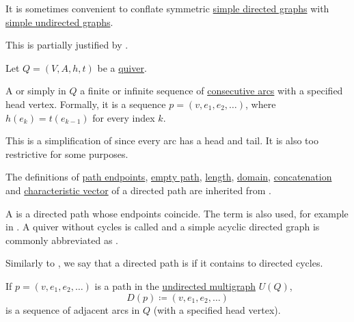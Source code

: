 \begin{remark}\label{rem:symmetric_directed_graphs}
  It is sometimes convenient to conflate symmetric \hyperref[def:quiver/simple]{simple directed graphs} with \hyperref[def:undirected_multigraph]{simple undirected graphs}.

  This is partially justified by .
\end{remark}

\begin{definition}\label{def:quiver_path}
  Let \( Q = (V, A, h, t) \) be a \hyperref[def:quiver]{quiver}.

  \begin{thmenum}
     A  or simply  in \( Q \) a finite or infinite sequence of \hyperref[def:quiver/adjacency]{consecutive arcs} with a specified head vertex. Formally, it is a sequence \( p = (v, e_1, e_2, \ldots) \), where \( h(e_k) = t(e_{k-1}) \) for every index \( k \).

    This is a simplification of  since every arc has a head and tail. It is also too restrictive for some purposes.

    The definitions of \hyperref[def:undirected_multigraph_path/endpoints]{path endpoints}, \hyperref[def:undirected_multigraph_path/empty]{empty path}, \hyperref[def:undirected_multigraph_path/length]{length}, \hyperref[def:undirected_multigraph_path/domain]{domain}, \hyperref[def:undirected_multigraph_path/concatenation]{concatenation} and \hyperref[def:undirected_multigraph_path/characteristic_vector]{characteristic vector} of a directed path are inherited from .

     A  is a directed path whose endpoints coincide. The term  is also used, for example in \cite[ch. 1, sec. 3.2]{GondranMinoux1984Graphs}. A quiver without cycles is called  and a simple acyclic directed graph is commonly abbreviated as .

     Similarly to , we say that a directed path is  if it contains to directed cycles.

     If \( p = (v, e_1, e_2, \ldots) \) is a path in the \hyperref[def:undirected_multigraph]{undirected multigraph} \( U(Q) \),
    \begin{equation*}
      D(p) \coloneqq (v, e_1, e_2, \ldots)
    \end{equation*}
    is a sequence of adjacent arcs in \( Q \) (with a specified head vertex).


\end{thmenum}
\end{definition}
